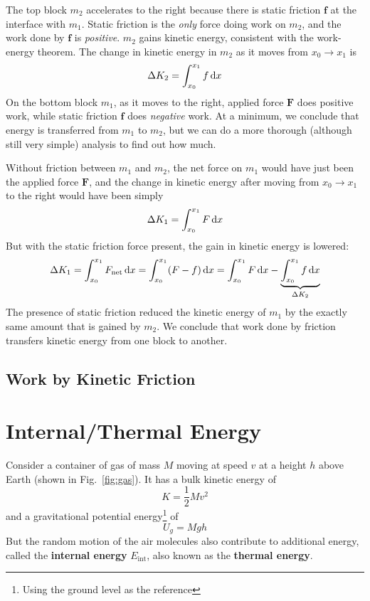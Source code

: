 \documentclass[11pt]{article}
\begin{document}
The top block $m_2$ accelerates to the right because there is static
friction $\mathbf f$ at the interface with $m_1$. Static friction is the
\emph{only} force doing work on $m_2$, and the work done by $\mathbf f$ is
\emph{positive}. $m_2$ gains kinetic energy, consistent with the work-energy
theorem. The change in kinetic energy in $m_2$ as it moves from
$x_0\longrightarrow x_1$ is
\begin{equation*}
  \Delta K_2=\int_{x_0}^{x_1} f\dl x
\end{equation*}
On the bottom block $m_1$, as it moves to the right, applied force $\mathbf F$
does positive work, while static friction $\mathbf f$ does \emph{negative}
work. At a minimum, we conclude that energy is transferred from $m_1$ to $m_2$,
but we can do a more thorough (although still very simple) analysis to find out
how much.

Without friction between $m_1$ and $m_2$, the net force on $m_1$ would have
just been the applied force $\mathbf F$, and the change in kinetic energy after
moving from $x_0\longrightarrow x_1$ to the right would have been simply
\begin{equation*}
  \Delta K_1 = \int_{x_0}^{x_1} F\dl x
\end{equation*}
But with the static friction force present, the gain in kinetic energy is
lowered:
\begin{equation*}
  \Delta K_1 = \int_{x_0}^{x_1} F_\text{net}\dl x =
  \int_{x_0}^{x_1} (F-f)\dl x = \int_{x_0}^{x_1} F\dl x -
  \underbrace{\int_{x_0}^{x_1} f\dl x}_{\Delta K_2}
\end{equation*}
The presence of static friction reduced the kinetic energy of $m_1$ by the
exactly same amount that is gained by $m_2$. We conclude that work done by
friction transfers kinetic energy from one block to another.

\subsection{Work by Kinetic Friction}


\section{Internal/Thermal Energy}

Consider a container of gas of mass $M$ moving at speed $v$ at a height $h$
above Earth (shown in Fig.~\ref{fig:gas}). It has a bulk kinetic energy of
\begin{equation*}
  K=\dfrac12 Mv^2
\end{equation*}
and a gravitational potential energy\footnote{Using the ground level as the
reference} of
\begin{equation*}
  U_g=Mgh
\end{equation*}
But the random motion of the air molecules also contribute to additional
energy, called the \textbf{internal energy} $E_\text{int}$, also known as the
\textbf{thermal energy}.
\end{document}
